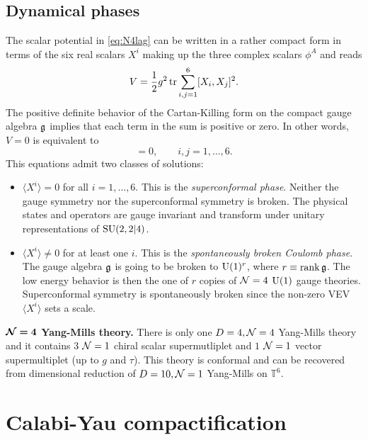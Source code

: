 \documentclass[a4paper,10pt]{article}
\begin{document}
    \subsection{Dynamical phases}

        The scalar potential in \eqref{eq:N4lag} can be written in a rather compact form in terms of the six real scalars $X^i$ making up the three complex scalars $\phi^A$ and reads
        \begin{equation}
            V = \frac{1}{2}g^2\tr\sum^6_{i,j=1}[X_i,X_j]^2.
        \end{equation}
        The positive definite behavior of the Cartan-Killing form on the compact gauge algebra $\mathfrak{g}$ implies that each term in the sum is positive or zero. In other words, $V=0$ is equivalent to
        \begin{equation}
            [X^i,X^j]=0,\qquad i,j=1,\dots,6.
        \end{equation}
        This equations admit two classes of solutions:
        \begin{itemize}
            \item $\langle X^i\rangle=0$ for all $i=1,\dots,6$. This is the \emph{superconformal phase}. Neither the gauge symmetry nor the superconformal symmetry is broken. The physical states and operators are gauge invariant and transform under
            unitary representations of $\text{SU}(2,2|4)$.
            \item  $\langle X^i\rangle\neq0$ for at least one $i$. This is the \emph{spontaneously broken Coulomb phase}. The gauge algebra $\mathfrak{g}$ is going to be broken to $\text{U}(1)^r$, where $r\equiv\rank\mathfrak{g}$. The low energy behavior is then the one of $r$ copies of $\mathcal{N}=4$ $\text{U}(1)$ gauge theories. Superconformal symmetry is spontaneously broken since the non-zero VEV $\langle X^i\rangle$ sets a scale.
        \end{itemize}

        \begin{result}
            \textbf{$\boldsymbol{\mathcal{N}=4}$ Yang-Mills theory.} There is only one $D=4,\mathcal{N}=4$ Yang-Mills theory and it contains $3$ $\mathcal{N}=1$ chiral scalar supermutliplet and $1$ $\mathcal{N}=1$ vector supermultiplet (up to $g$ and $\tau$). This theory is conformal and can be recovered from dimensional reduction of $D=10,\mathcal{N}=1$ Yang-Mills on $\mathbb{T}^6$.
        \end{result}

\section{Calabi-Yau compactification}\label{sec:appCY}
\end{document}
